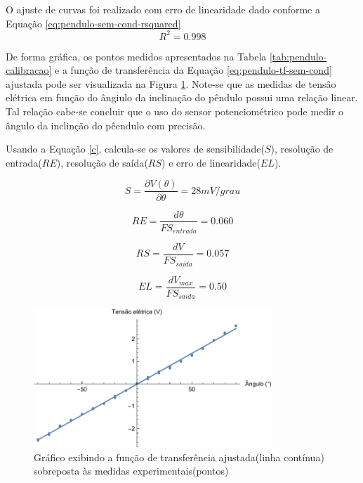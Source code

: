 \documentclass[a4paper]{instrumentacao}
\begin{document}
O ajuste de curvas foi realizado com erro de linearidade dado conforme a Equação \ref{eq:pendulo-sem-cond-rsquared}
%
\begin{equation}
	R^2 = 0.998
	\label{eq:pendulo-sem-cond-rsquared}
\end{equation}
%

De forma gráfica, os pontos medidos apresentados na Tabela \ref{tab:pendulo-calibracao} e a função de transferência da Equação \ref{eq:pendulo-tf-sem-cond} ajustada pode ser visualizada na Figura \ref{fig:pendulo-tf-sem-cond}. Note-se que as medidas de tensâo elétrica em função do ângiulo da inclinação do pêndulo possui uma relação linear. Tal relação cabe-se concluir que o uso do sensor potenciométrico pode medir o ângulo da inclinção do pêendulo com precisão.

Usando a Equação \ref{c}, calcula-se os valores de sensibilidade($S$), resolução de entrada($RE$), resolução de saída($RS$) e erro de linearidade($EL$).

\begin{equation}
	S = \dfrac{\partial V(\theta)}{\partial \theta} = 28mV/grau
	\label{eq:sensibilidade-sem-cond}
\end{equation}

\begin{equation}
	RE = \dfrac{d\theta}{FS_{entrada}} = 0.060
	\label{eq:resolucao-entrada-sem-cond}
\end{equation}

\begin{equation}
	RS = \dfrac{dV}{FS_{saida}} = 0.057
	\label{eq:resolucao-saida-sem-cond}
\end{equation}

\begin{equation}
	EL = \dfrac{dV_{max}}{FS_{saida}} = 0.50
	\label{eq:resolucao-saida-sem-cond}
\end{equation}


\begin{figure}[]
\centering
\includegraphics[width=0.8\textwidth]{Pendulo-fit.pdf}
\caption{Gráfico exibindo a função de transferência ajustada(linha contínua) sobreposta às medidas experimentais(pontos)}
\label{fig:pendulo-tf-sem-cond}
\end{figure}
\end{document}
